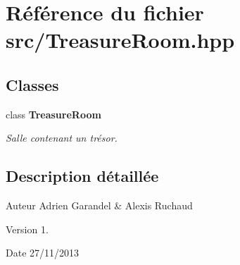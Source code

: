 \section{Référence du fichier src/\-Treasure\-Room.hpp}
\label{_treasure_room_8hpp}
\subsection*{Classes}
\begin{DoxyCompactItemize}
\item 
class {\bf Treasure\-Room}
\begin{DoxyCompactList}\small\item\em Salle contenant un trésor. \end{DoxyCompactList}\end{DoxyCompactItemize}


\subsection{Description détaillée}
\begin{DoxyAuthor}{Auteur}
Adrien Garandel \& Alexis Ruchaud 
\end{DoxyAuthor}
\begin{DoxyVersion}{Version}
1. 
\end{DoxyVersion}
\begin{DoxyDate}{Date}
27/11/2013 
\end{DoxyDate}
